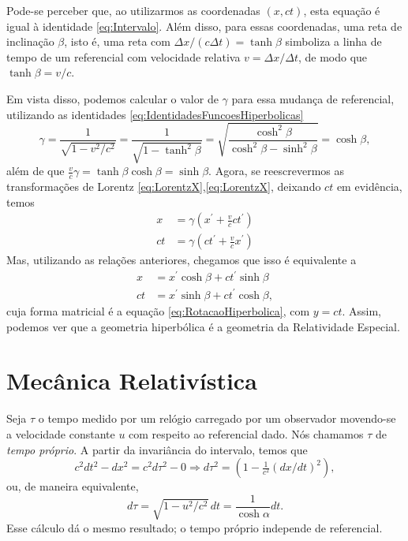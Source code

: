Pode-se perceber que, ao utilizarmos as coordenadas $(x,ct)$, esta equação é igual à identidade \eqref{eq:Intervalo}. Além disso, para essas coordenadas, uma reta de inclinação $\beta$, isto é, uma reta com $\Delta x/(c\Delta t)=\tanh\beta$ simboliza a linha de tempo de um referencial com velocidade relativa $v = \Delta x/\Delta t$, de modo que $\tanh\beta=v/c$.

Em vista disso, podemos calcular o valor de $\gamma$ para essa mudança de referencial, utilizando as identidades \eqref{eq:IdentidadesFuncoesHiperbolicas}
\[
    \gamma = \frac{1}{\sqrt{1-v^2/c^2}}=\frac{1}{\sqrt{1-\tanh^2\beta}}
    =\sqrt{\frac{\cosh^2\beta}{\cosh^2\beta-\sinh^2\beta}}=\cosh\beta ,
\]
além de que $\tfrac{v}{c}\gamma = \tanh\beta\cosh\beta=\sinh\beta$. Agora, se reescrevermos as transformações de Lorentz \eqref{eq:LorentzX},\eqref{eq:LorentzX}, deixando $ct$ em evidência, temos
\begin{equation}
\begin{aligned} x &=\gamma\left(x^{\prime}+\frac{v}{c} c t^{\prime}\right) \\ c t &=\gamma\left(c t^{\prime}+\frac{v}{c} x^{\prime}\right) \end{aligned}
\end{equation}
Mas, utilizando as relações anteriores, chegamos que isso é equivalente a
\begin{equation}
\begin{aligned} x &=x^{\prime} \cosh \beta+c t^{\prime} \sinh \beta \\ c t &=x^{\prime} \sinh \beta+c t^{\prime} \cosh \beta ,\end{aligned}
\end{equation}
cuja forma matricial é a equação \eqref{eq:RotacaoHiperbolica}, com $y=ct$. Assim, podemos ver que a geometria hiperbólica é a geometria da Relatividade Especial.

\section{Mecânica Relativística}
Seja $\tau$ o tempo medido por um relógio carregado por um observador movendo-se a velocidade constante $u$ com respeito ao referencial dado. Nós chamamos $\tau$ de \textit{tempo próprio}. A partir da invariância do intervalo, temos que
\[
  c^2dt^2-dx^2=c^2d\tau^2 -0 \Rightarrow d\tau^2 =  
  \left( 1-\tfrac{1}{c^2}\left( dx/dt \right)^2 \right),
\]
ou, de maneira equivalente,
\[
    d\tau = \sqrt{1-u^2/c^2} \,dt = \frac{1}{\cosh\alpha}dt.
\]
Esse cálculo dá o mesmo resultado; o tempo próprio independe de referencial.

